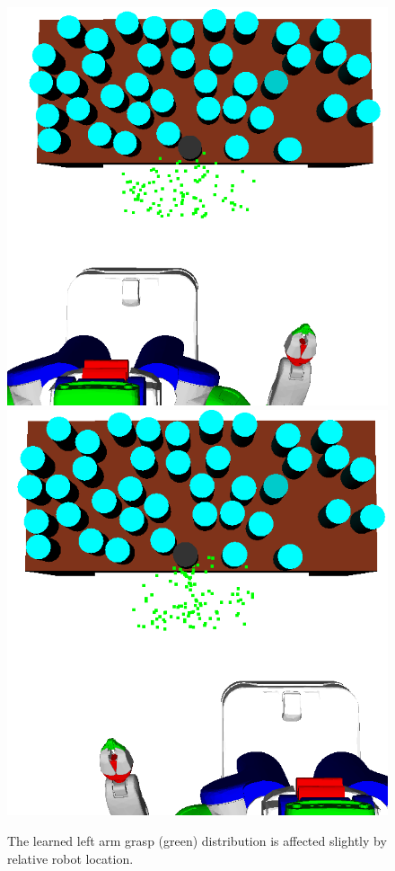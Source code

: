 \begin{figure}[t]
  \centering
    \noindent
    \includegraphics[scale=0.15]{images/grasp_context_left.png}\hspace{6mm}
    \includegraphics[scale=0.15]{images/grasp_context_right.png}
  \caption{\small{The learned left arm grasp (green) distribution is affected slightly
by relative robot location.}}
  \label{fig:context}
\end{figure}

